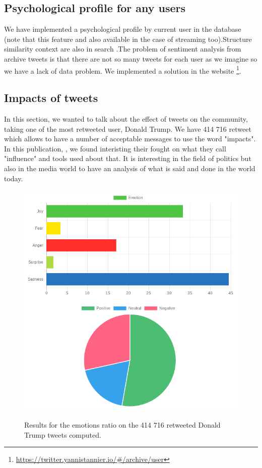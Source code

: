 \documentclass{acmtog} %
\begin{document}
\subsection{Psychological profile for any users}
\label{subsub:psychological_profile}

We have implemented a psychological profile by current user in the database (note that this feature and also available in the case of streaming too).Structure similarity context are also in search \cite{Zou18}.The problem of sentiment analysis from archive tweets is that there are not so many tweets for each user as we imagine so we have a lack of data problem.
We implemented a solution in the website \footnote{\url{https://twitter.yannistannier.io/#/archive/user}}.

\subsection{Impacts of tweets}
\label{subsub:impacts_tweets}

In this section, we wanted to talk about the effect of tweets on the community, taking one of the most retweeted user, Donald Trump. We have 414 716 retweet which allows to have a number of acceptable messages to use the word "impacts". In this publication, \cite{Vyas17}, we found interisting their fought on what they call "influence" and tools used about that. It is interesting in the field of politics but also in the media world to have an analysis of what is said and done in the world today.

\begin{figure}[H]
{\includegraphics[width=\linewidth]{retweeted_emotion_sentiment_trump-exemple.png}}
\caption{Results for the emotions ratio on the 414 716 retweeted Donald Trump tweets computed.}
  \label{fig:trump_results}
\end{figure}
\end{document}
